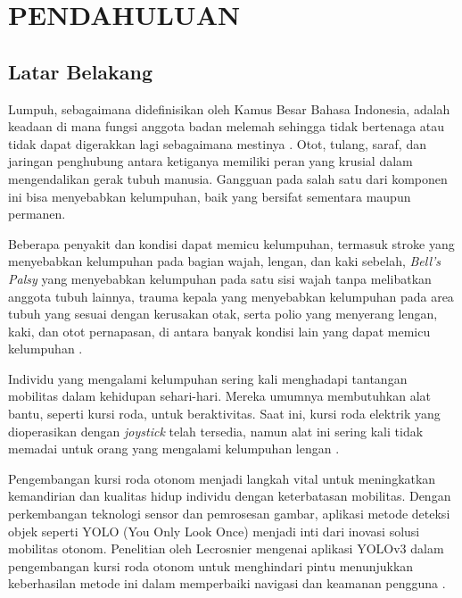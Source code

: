 \chapter{PENDAHULUAN}
\label{chap:pendahuluan}




\section{Latar Belakang}
\label{sec:latarbelakang}

Lumpuh, sebagaimana didefinisikan oleh Kamus Besar Bahasa Indonesia, adalah keadaan di mana fungsi anggota badan melemah sehingga tidak bertenaga atau tidak dapat digerakkan lagi sebagaimana mestinya \parencite{Daring_2016}. Otot, tulang, saraf, dan jaringan penghubung antara ketiganya memiliki peran yang krusial dalam mengendalikan gerak tubuh manusia. Gangguan pada salah satu dari komponen ini bisa menyebabkan kelumpuhan, baik yang bersifat sementara maupun permanen.

Beberapa penyakit dan kondisi dapat memicu kelumpuhan, termasuk stroke yang menyebabkan kelumpuhan pada bagian wajah, lengan, dan kaki sebelah, \emph{Bell's Palsy} yang menyebabkan kelumpuhan pada satu sisi wajah tanpa melibatkan anggota tubuh lainnya, trauma kepala yang menyebabkan kelumpuhan pada area tubuh yang sesuai dengan kerusakan otak, serta polio yang menyerang lengan, kaki, dan otot pernapasan, di antara banyak kondisi lain yang dapat memicu kelumpuhan \parencite{Pansawira_2022}.

Individu yang mengalami kelumpuhan sering kali menghadapi tantangan mobilitas dalam kehidupan sehari-hari. Mereka umumnya membutuhkan alat bantu, seperti kursi roda, untuk beraktivitas. Saat ini, kursi roda elektrik yang dioperasikan dengan \emph{joystick} telah tersedia, namun alat ini sering kali tidak memadai untuk orang yang mengalami kelumpuhan lengan \parencite{choi2019motion}.

Pengembangan kursi roda otonom menjadi langkah vital untuk meningkatkan kemandirian dan kualitas hidup individu dengan keterbatasan mobilitas. Dengan perkembangan teknologi sensor dan pemrosesan gambar, aplikasi metode deteksi objek seperti YOLO (You Only Look Once) menjadi inti dari inovasi solusi mobilitas otonom. Penelitian oleh Lecrosnier mengenai aplikasi YOLOv3 dalam pengembangan kursi roda otonom untuk menghindari pintu menunjukkan keberhasilan metode ini dalam memperbaiki navigasi dan keamanan pengguna \parencite{lecrosnier2021deep}.

